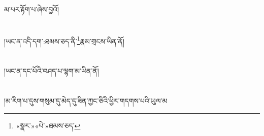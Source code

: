 མ་པར་རྟོག་པ་ཞེས་བྱའོ།\chapter{ }།ཡང་ན་འདི་དག་:ཐམས་ཅད་ནི་\footnote{«སྣར་»«པེ་»ཐམས་ཅད་}རྣམ་གྲངས་ཡིན་ནོ།\chapter{ }།ཡང་ན་དང་པོའི་བཤད་པ་ལྷག་མ་ཡིན་ནོ།\chapter{ }།མ་རིག་པ་དུས་གསུམ་དུ་མེད་དུ་ཟིན་ཀྱང་ཅིའི་ཕྱིར་གདགས་པའི་ཡུལ་མ